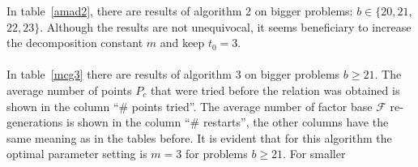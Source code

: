 \documentclass[thesis=M,english]{FITthesis}[2012/10/20]
\theoremstyle{remark}
\theoremstyle{definition}
\begin{document}
\noindent In table~\ref{amad2}, there are results of algorithm 2 on bigger problems: $b \in \{20, 21,$\\ $22, 23\}.$ Although the results are not unequivocal, it seems beneficiary to increase the decomposition constant $m$ and keep $t_0 = 3$. 
\\ \\
\noindent In table~\ref{mcg3} there are results of algorithm 3 on bigger problems $b\geq 21$. The average number of points $P_c$ that were tried before the relation was obtained is shown in the column \enquote{\# points tried}. The average number of factor base $\mathcal{F}$ re-generations is shown in the column \enquote{\# restarts}, the other columns have the same meaning as in the tables before. It is evident that for this algorithm the optimal parameter setting is $m=3$ for problems $b\geq 21$. For smaller
\end{document}
